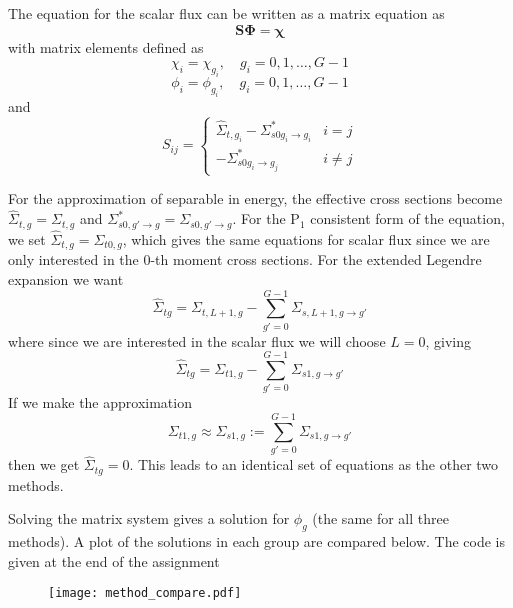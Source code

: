 \documentclass[12pt]{article}
\newcommand{\ra}{\rightarrow}
\newenvironment{solnum}[2][Solution]{\begin{trivlist}
\item[\hskip \labelsep {\bfseries #1}\hskip \labelsep {\bfseries #2:}]\hspace{0.3in}\newline\newline}{\end{trivlist}}
\begin{document}
\begin{solnum}{2}
The equation for the scalar flux can be written as a matrix equation as
\begin{equation}
    \mathbf{S\Phi} = \boldsymbol{\chi}
\end{equation}
with matrix elements defined as
\begin{equation}
    \chi_i = \chi_{g_i}, \quad g_i=0,1,\ldots,G-1
\end{equation}
\begin{equation}
    \phi_i = \phi_{g_i}, \quad g_i=0,1,\ldots,G-1
\end{equation}
and
\begin{equation}
    S_{ij} = \left\{\begin{matrix}
        \hat\Sigma_{t,g_i} -\Sigma^*_{s0g_{i}\ra g_{i}} & i=j
        \\  
        -\Sigma^*_{s0g_i\ra g_j} & i \neq j
    \end{matrix}\right.
\end{equation}

For the approximation of separable in energy, the effective cross sections become $\hat\Sigma_{t,g} = \Sigma_{t,g}$ and
$\Sigma^*_{s0,g'\ra g} = \Sigma_{s0,g'\ra g}$.
For the P$_1$ consistent form of the equation, we set $\hat\Sigma_{t,g} =
\Sigma_{t0,g}$, which gives the same equations for scalar flux since we
are only interested in the $0$-th moment cross sections. For the extended Legendre
expansion we want
\begin{equation}
    \hat\Sigma_{tg} = \Sigma_{t,L+1,g} - \sum_{g'=0}^{G-1} \Sigma_{s,L+1,g\ra g'}
\end{equation}
where since we are interested in the scalar flux we will choose $L=0$, giving
\begin{equation}
    \hat\Sigma_{tg} = \Sigma_{t1,g} - \sum_{g'=0}^{G-1} \Sigma_{s1,g\ra g'}
\end{equation}
If we make the approximation
\begin{equation}
\Sigma_{t1,g} \approx \Sigma_{s1,g} := \sum_{g'=0}^{G-1} \Sigma_{s1,g\ra g'}
\end{equation}
then we get $\hat\Sigma_{tg} = 0$.  This leads to an identical set of equations as
the other two methods.

Solving the matrix system gives a solution for $\phi_g$ (the same for all three
methods).  A plot of the solutions
in each group are compared below. The code is given at the end of the assignment

\begin{figure}[h!]
    \centering
    \texttt{[image: method\_compare.pdf]}
\end{figure}





    



\end{solnum}
\end{document}
